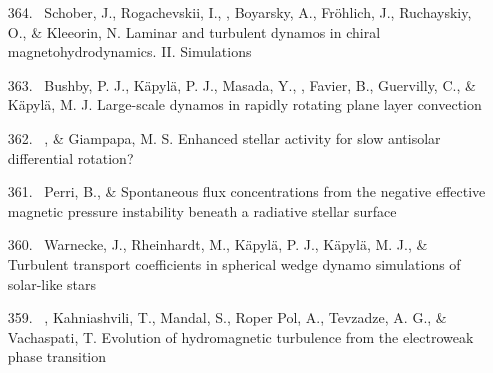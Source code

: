 \begin{itemize}
\item[{364.}~]
Schober, J., Rogachevskii, I., \Brandenburg, Boyarsky, A., Fr\"ohlich, J., Ruchayskiy, O., \& Kleeorin, N.
{Laminar and turbulent dynamos in chiral magnetohydrodynamics. II. Simulations}

\item[{363.}~]
Bushby, P. J., K\"apyl\"a, P. J., Masada, Y., \Brandenburg, Favier, B., Guervilly, C., \& K\"apyl\"a, M. J.
{Large-scale dynamos in rapidly rotating plane layer convection}

\item[{362.}~]
\Brandenburg, \& Giampapa, M. S.
{Enhanced stellar activity for slow antisolar differential rotation?}

\item[{361.}~]
Perri, B., \& \Brandenburg{}
{Spontaneous flux concentrations from the negative effective magnetic pressure instability beneath a radiative stellar surface}

\item[{360.}~]
Warnecke, J., Rheinhardt, M., K\"apyl\"a, P. J., K\"apyl\"a, M. J., \& \Brandenburg{}
{Turbulent transport coefficients in spherical wedge dynamo simulations of solar-like stars}

\item[{359.}~]
\Brandenburg, Kahniashvili, T., Mandal, S., Roper Pol, A., Tevzadze, A. G., \& Vachaspati, T.
{Evolution of hydromagnetic turbulence from the electroweak phase transition}


\end{itemize}
